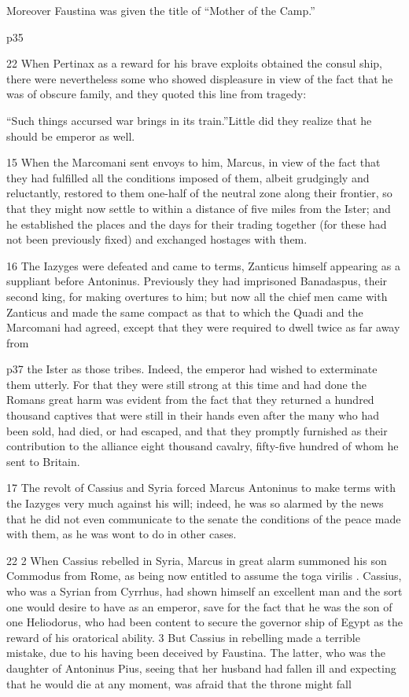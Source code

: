 Moreover Faustina was given the title of ``Mother of the Camp.''

p35

22
When Pertinax as a reward for his brave exploits obtained the consul ­ship, there were nevertheless some who showed displeasure in view of the fact that he was of obscure family, and they quoted this line from tragedy:

``Such things accursed war brings in its train.''\texthebrew{⁠}Little did they realize that he should be emperor as well.

15
When the Marcomani sent envoys to him, Marcus, in view of the fact that they had fulfilled all the conditions imposed of them, albeit grudgingly and reluctantly, restored to them one-half of the neutral zone along their frontier, so that they might now settle to within a distance of five miles\texthebrew{⁠} from the Ister; and he established the places and the days for their trading together (for these had not been previously fixed) and exchanged hostages with them.

16
The Iazyges were defeated and came to terms, Zanticus himself appearing as a suppliant before Antoninus. Previously they had imprisoned Banadaspus, their second king, for making overtures to him; but now all the chief men came with Zanticus and made the same compact as that to which the Quadi and the Marcomani had agreed, except that they were required to dwell twice as far away from

p37 the Ister as those tribes. Indeed, the emperor had wished to exterminate them utterly. For that they were still strong at this time and had done the Romans great harm was evident from the fact that they returned a hundred thousand captives that were still in their hands even after the many who had been sold, had died, or had escaped, and that they promptly furnished as their contribution to the alliance eight thousand cavalry, fifty-five hundred of whom he sent to Britain.

17
The revolt of Cassius and Syria forced Marcus Antoninus to make terms with the Iazyges very much against his will; indeed, he was so alarmed by the news that he did not even communicate to the senate the conditions of the peace made with them, as he was wont to do in other cases.

22 2
When Cassius rebelled in Syria, Marcus in great alarm summoned his son Commodus from Rome, as being now entitled to assume the toga virilis . Cassius, who was a Syrian from Cyrrhus, had shown himself an excellent man and the sort one would desire to have as an emperor, save for the fact that he was the son of one Heliodorus,\texthebrew{⁠} who had been content to secure the governor ­ship of Egypt as the reward of his oratorical ability. 3 But Cassius in rebelling made a terrible mistake, due to his having been deceived by Faustina. The latter, who was the daughter of Antoninus Pius, seeing that her husband had fallen ill and expecting that he would die at any moment, was afraid that the throne might fall

